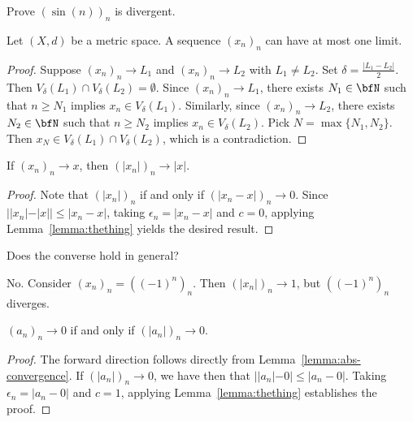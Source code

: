     \begin{exercise}
        Prove $(\sin(n))_n$ is divergent.
    \end{exercise}

    \begin{proposition}
        Let $(X,d)$ be a metric space. A sequence $(x_n)_n$ can have at most one limit.
    \end{proposition}
        \begin{proof}
            Suppose $(x_n)_n \rightarrow L_1$ and $(x_n)_n \rightarrow L_2$ with $L_1 \neq L_2$. Set $\delta = \frac{|L_1 - L_2|}{2}$. Then $V_\delta(L_1) \cap V_\delta(L_2) = \emptyset$. Since $(x_n)_n \rightarrow L_1$, there exists $N_1 \in \bfN$ such that $n \geq N_1$ implies $x_n \in V_\delta(L_1)$. Similarly, since $(x_n)_n \rightarrow L_2$, there exists $N_2 \in \bfN$ such that $n \geq N_2$ implies $x_n \in V_\delta(L_2)$. Pick $N = \max\{N_1,N_2\}$. Then $x_N \in V_\delta(L_1) \cap V_\delta(L_2)$, which is a contradiction.
        \end{proof}

    \begin{lemma}\label{lemma:abs-convergence}
        If $(x_n)_n \rightarrow x$, then $(|x_n|)_n \rightarrow |x|$.
    \end{lemma}
        \begin{proof}
            Note that $(|x_n|)_n$ if and only if $(|x_n -x|)_n \rightarrow 0$. Since $||x_n| - |x|| \leq |x_n - x|$, taking $\epsilon_n = |x_n - x|$ and $c = 0$, applying Lemma~\ref{lemma:thething} yields the desired result.
        \end{proof}

    \begin{question}
        Does the converse hold in general?
    \end{question}
    \begin{answer}
        No. Consider $(x_n)_n = ((-1)^n)_n$. Then $(|x_n|)_n \rightarrow 1$, but $((-1)^n)_n$ diverges.
    \end{answer}

    \begin{lemma}\label{lemma:abs-convergence}
        $(a_n)_n \rightarrow 0$ if and only if $(|a_n|)_n \rightarrow 0$.
    \end{lemma}
        \begin{proof}
            The forward direction follows directly from Lemma~\ref{lemma:abs-convergence}. If $(|a_n|)_n \rightarrow 0$, we have then that $||a_n| - 0| \leq |a_n - 0|$. Taking $\epsilon_n = |a_n - 0|$ and $c = 1$, applying Lemma~\ref{lemma:thething} establishes the proof.
        \end{proof}

